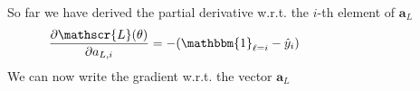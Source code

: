 \begin{frame}
\begin{columns}
    \begin{overlayarea}{\textwidth}{\textheight}
    \end{overlayarea}
  \end{columns}
\end{frame}

\begin{frame}
  \begin{columns}
    \begin{overlayarea}{\textwidth}{\textheight}
      So far we have derived the partial derivative w.r.t. the $i$-th element of $\mathbf{a}_{L}$
      \begin{equation*}
        \hspace{-2cm}\frac{\partial \mathscr{L}(\theta)}{\partial a_{L,i}} =
        - (\mathbbm{1}_{\ell = i} - \hat{y}_{i})
      \end{equation*}
      We can now write the gradient w.r.t. the vector $\mathbf{a}_{L}$


\end{overlayarea}
\end{columns}
\end{frame}

